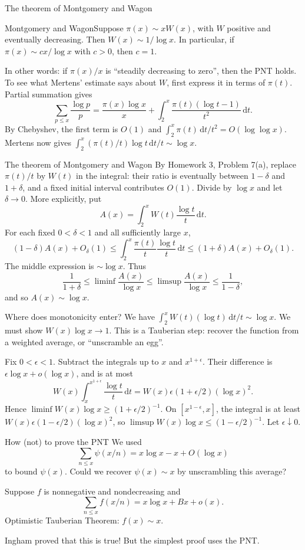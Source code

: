 \documentclass[aspectratio=169,11pt]{beamer}
\newcommand{\dd}{\,\mathrm d}
\begin{document}
\begin{frame}{The theorem of Montgomery and Wagon}
\begin{block}{Montgomery and Wagon}Suppose $\pi(x)\sim xW(x)$, with $W$ positive and eventually decreasing. Then $W(x)\sim1/\log x$. In particular, if $\pi(x)\sim cx/\log x$ with $c>0$, then $c=1$.\end{block}
In other words: if $\pi(x)/x$ is ``steadily decreasing to zero'', then the PNT holds. To see what Mertens' estimate says about $W$, first express it in terms of $\pi(t)$. Partial summation gives
\[\sum_{p\le x}\frac{\log p}p=\frac{\pi(x)\log x}x+\int_2^x\frac{\pi(t)(\log t-1)}{t^2}\dd t.\]
By Chebyshev, the first term is $O(1)$ and $\int_2^x\pi(t)\dd t/t^2=O(\log\log x)$. Mertens now gives $\int_2^x(\pi(t)/t)\log t\dd t/t\sim\log x$.
\end{frame}
\begin{frame}{The theorem of Montgomery and Wagon}
By Homework 3, Problem 7(a), replace $\pi(t)/t$ by $W(t)$ in the integral: their ratio is eventually between $1-\delta$ and $1+\delta$, and a fixed initial interval contributes $O(1)$. Divide by $\log x$ and let $\delta\to0$.
More explicitly, put
\[A(x)=\int_2^x W(t)\frac{\log t}{t}\dd t.\]
For each fixed $0<\delta<1$ and all sufficiently large $x$,
\[(1-\delta)A(x)+O_\delta(1)\le
\int_2^x\frac{\pi(t)}t\frac{\log t}{t}\dd t
\le(1+\delta)A(x)+O_\delta(1).\]
The middle expression is $\sim\log x$. Thus
\[\frac1{1+\delta}\le\liminf\frac{A(x)}{\log x}
\le\limsup\frac{A(x)}{\log x}\le\frac1{1-\delta},\]
and so $A(x)\sim\log x$.
\end{frame}
\begin{frame}{Where does monotonicity enter?}
We have $\int_2^x W(t)(\log t)\dd t/t\sim\log x$. We must show $W(x)\log x\to1$. This is a Tauberian step: recover the function from a weighted average, or ``unscramble an egg''.

Fix $0<\epsilon<1$. Subtract the integrals up to $x$ and $x^{1+\epsilon}$. Their difference is $\epsilon\log x+o(\log x)$, and is at most
\[W(x)\int_x^{x^{1+\epsilon}}\frac{\log t}t\dd t=W(x)\epsilon(1+\epsilon/2)(\log x)^2.\]
Hence $\liminf W(x)\log x\ge(1+\epsilon/2)^{-1}$. On $[x^{1-\epsilon},x]$, the integral is at least $W(x)\epsilon(1-\epsilon/2)(\log x)^2$, so $\limsup W(x)\log x\le(1-\epsilon/2)^{-1}$. Let $\epsilon\downarrow0$.
\end{frame}
\begin{frame}{How (not) to prove the PNT}
We used
\[\sum_{n\le x}\psi(x/n)=x\log x-x+O(\log x)\]
to bound $\psi(x)$. Could we recover $\psi(x)\sim x$ by unscrambling this average?

Suppose $f$ is nonnegative and nondecreasing and
\[\sum_{n\le x}f(x/n)=x\log x+Bx+o(x).\]
Optimistic Tauberian Theorem: $f(x)\sim x$.

Ingham proved that this is true! But the simplest proof uses the PNT.
\end{frame}
\end{document}
